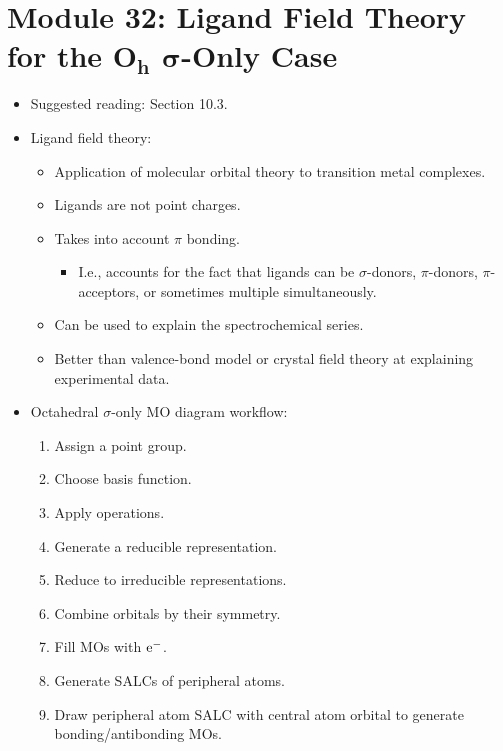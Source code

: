 \documentclass[../notes.tex]{subfiles}
\begin{document}
\section[Module 32: Ligand Field Theory for the \texorpdfstring{$O_h$}{TEXT} \texorpdfstring{$\sigma$}{TEXT}-Only Case]{Module 32: Ligand Field Theory for the \texorpdfstring{$\bm{O_h}$}{TEXT} \texorpdfstring{$\bm{\sigma}$}{TEXT}-Only Case}
\begin{itemize}
    \item {}Suggested reading: \textcite{bib:MiesslerFischerTarr} Section 10.3.
    \item Ligand field theory:
    \begin{itemize}
        \item Application of molecular orbital theory to transition metal complexes.
        \item Ligands are not point charges.
        \item Takes into account $\pi$ bonding.
        \begin{itemize}
            \item I.e., accounts for the fact that ligands can be $\sigma$-donors, $\pi$-donors, $\pi$-acceptors, or sometimes multiple simultaneously.
        \end{itemize}
        \item Can be used to explain the spectrochemical series.
        \item Better than valence-bond model or crystal field theory at explaining experimental data.
    \end{itemize}
    \item Octahedral $\sigma$-only MO diagram workflow:
    \begin{enumerate}
        \item Assign a point group.
        \item Choose basis function.
        \item Apply operations.
        \item Generate a reducible representation.
        \item Reduce to irreducible representations.
        \item Combine orbitals by their symmetry.
        \item Fill MOs with $\e[-]$.
        \item Generate SALCs of peripheral atoms.
        \item Draw peripheral atom SALC with central atom orbital to generate bonding/antibonding MOs.

\end{enumerate}
\end{itemize}
\end{document}
